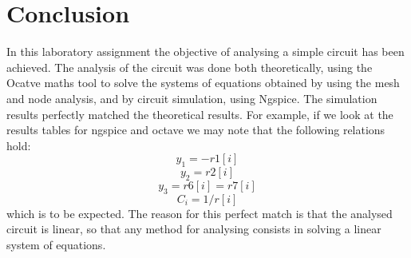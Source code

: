 \section{Conclusion}
\label{sec:conclusion}

In this laboratory assignment the objective of analysing a simple circuit has been
achieved. The analysis of the circuit was done both theoretically, 
using  the Ocatve maths tool to solve the systems of equations obtained by using the mesh 
and node analysis, and by circuit simulation, using Ngspice. The simulation results perfectly 
matched the theoretical results. For example, if we look at the results tables for ngspice and octave we may note that the 
following relations hold:
\begin{equation*}
    y_1 = -r1[i]
\end{equation*}
\begin{equation*}
    y_2 = r2[i]
\end{equation*}
\begin{equation*}
    y_3 = r6[i] = r7[i]
\end{equation*}
\begin{equation*}
    C_i = 1/r[i]
\end{equation*}
which is to be expected.
The reason for this perfect match is that the analysed circuit is linear,
 so that any method for analysing consists in solving a linear system of equations. 